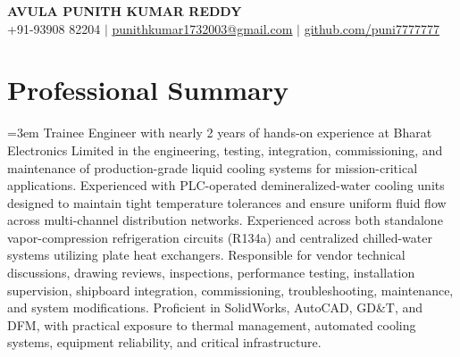 \documentclass[letterpaper,11pt]{article}
\newcommand{\resumeItem}[1]{
  \item\small{
    {\setlength{\rightskip}{0pt}\hyphenpenalty=10000\exhyphenpenalty=10000\emergencystretch=3em #1\par \vspace{-2pt}}
  }
}
\newcommand{\resumeItemListStart}{\begin{itemize}[leftmargin=0.15in, noitemsep, topsep=1.5pt, itemsep=2pt]}
\newcommand{\resumeItemListEnd}{\end{itemize}\vspace{-4pt}}
\begin{document}
\begin{center}
    \textbf{\Huge AVULA PUNITH KUMAR REDDY} \\ \vspace{1pt}
    \small +91-93908 82204 $|$ \href{mailto:punithkumar1732003@gmail.com}{\underline{punithkumar1732003@gmail.com}} $|$
    \href{https://github.com/puni7777777}{\underline{github.com/puni7777777}}
\end{center}

\section{Professional Summary}
\begingroup
\leftskip=0pt \rightskip=0pt
\emergencystretch=3em
Trainee Engineer with nearly 2 years of hands-on experience at Bharat Electronics Limited in the engineering, testing, integration, commissioning, and maintenance of production-grade liquid cooling systems for mission-critical applications. Experienced with PLC-operated demineralized-water cooling units designed to maintain tight temperature tolerances and ensure uniform fluid flow across multi-channel distribution networks. Experienced across both standalone vapor-compression refrigeration circuits (R134a) and centralized chilled-water systems utilizing plate heat exchangers. Responsible for vendor technical discussions, drawing reviews, inspections, performance testing, installation supervision, shipboard integration, commissioning, troubleshooting, maintenance, and system modifications. Proficient in SolidWorks, AutoCAD, GD\&T, and DFM, with practical exposure to thermal management, automated cooling systems, equipment reliability, and critical infrastructure.
\par
\endgroup


\end{document}
